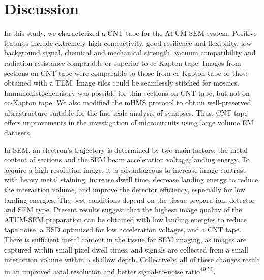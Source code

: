 \documentclass{article}
\begin{document}
\section*{Discussion}

In this study, we characterized a CNT tape for the ATUM-SEM system. Positive features include extremely high conductivity, good resilience and flexibility, low background signal, chemical and mechanical strength, vacuum compatibility and radiation-resistance comparable or superior to cc-Kapton tape. Images from sections on CNT tape were comparable to those from cc-Kapton tape or those obtained with a TEM. Image tiles could be seamlessly stitched for mosaics. Immunohistochemistry was possible for thin sections on CNT tape, but not on cc-Kapton tape. We also modified the mHMS protocol to obtain well-preserved ultrastructure suitable for the fine-scale analysis of synapses. Thus, CNT tape offers improvements in the investigation of microcircuits using large volume EM datasets.

In SEM, an electron’s trajectory is determined by two main factors: the metal content of sections and the SEM beam acceleration voltage/landing energy. To acquire a high-resolution image, it is advantageous to increase image contrast with heavy metal staining, increase dwell time, decrease landing energy to reduce the interaction volume, and improve the detector efficiency, especially for low landing energies. The best conditions depend on the tissue preparation, detector and SEM type. Present results suggest that the highest image quality of the ATUM-SEM preparation can be obtained with low landing energies to reduce tape noise, a BSD optimized for low acceleration voltages, and a CNT tape. There is sufficient metal content in the tissue for SEM imaging, as images are captured within small pixel dwell times, and signals are collected from a small interaction volume within a shallow depth. Collectively, all of these changes result in an improved axial resolution and better signal-to-noise ratio\textsuperscript{49,50}.
\end{document}
